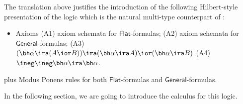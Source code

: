 The translation above justifies the introduction of the following Hilbert-style presentation of the logic which is the natural multi-type counterpart of \Inql:
\begin{itemize}
\item Axioms \subitem (A1) \CPC axiom schemata for $\mathsf{Flat}$-formulas;
\subitem (A2) \IPC axiom schemata for $\mathsf{General}$-formulas;
\subitem (A3) $(\bh\alpha \ira (A \ior B)) \ira (\bh\alpha \ira A) \ior (\bh\alpha \ira B)$ \subitem (A4) $\ineg \ineg \bh \alpha \ira \bh \alpha$.
\end{itemize}
plus Modus Ponens rules for both $\mathsf{Flat}$-formulas and $\mathsf{General}$-formulas.

In the following section, we are going to introduce the calculus for this logic.